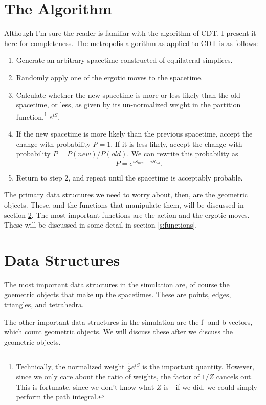 \message{ !name(programmers_guide.tex)}\documentclass[12pt]{article}
\begin{document}
\section{The Algorithm}
\label{s:algorithm}
Although I'm sure the reader is familiar with the algorithm of CDT, I
present it here for completeness. The metropolis algorithm as applied
to CDT is as follows:
\begin{enumerate}
\item Generate an arbitrary spacetime constructed of equilateral simplices.
\item Randomly apply one of the ergotic moves to the spacetime.
\item Calculate whether the new spacetime is more or less likely than
  the old spacetime, or less, as given by its un-normalized weight in
  the partition function,\footnote{Technically, the normalized weight
    $\frac{1}{Z}e^{iS}$ is the important quantity. However, since we
    only care about the ratio of weights, the factor of $1/Z$ cancels
    out. This is fortunate, since we don't know what $Z$ is---if we
    did, we could simply perform the path integral.} $e^{i S}$.
\item If the new spacetime is more likely than the previous spacetime,
  accept the change with probability $P=1$. If it is less likely,
  accept the change with probability $P = P(new)/P(old)$. We can
  rewrite this probability as
  $$P = e^{i S_{new} - i S_{old}}.$$
\item Return to step 2, and repeat until the spacetime is acceptably
  probable.
\end{enumerate}
The primary data structures we need to worry about, then, are the
geometric objects. These, and the functions that manipulate them, will
be discussed in section \ref{s:data-structures}. The most important
functions are the action and the ergotic moves. These will be
discussed in some detail in section \ref{s:functions}.

\section{Data Structures}
\label{s:data-structures}

The most important data structures in the simulation are, of course
the goemetric objects that make up the spacetimes. These are points,
edges, triangles, and tetrahedra. 

The other important data structures in the simulation are the f- and
b-vectors, which count geometric objects. We will discuss these after
we discuss the geometric objects.
\end{document}
